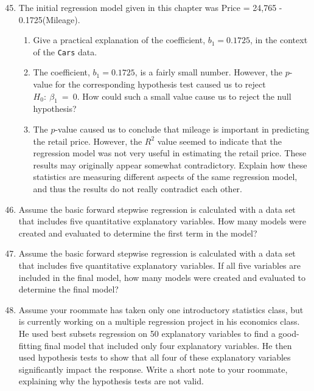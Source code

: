 \documentclass[
]{report}
\begin{document}
\begin{enumerate}
  \setcounter{enumi}{44}

  \item The initial regression model given in this chapter was Price = 24,765 - 0.1725(Mileage).
    \begin{enumerate}
      \item Give a practical explanation of the coefficient, $\scriptstyle b_1 = 0.1725$, in the context of the \texttt{Cars} data.
      \item The coefficient, $\scriptstyle b_1 = 0.1725$, is a fairly small number. However, the $\scriptstyle p$-value for the corresponding hypothesis test caused us to reject $\scriptstyle H_0:\  \beta_1 \ =\  0$. How could such a small value cause us to reject the null hypothesis?
      \item The $\scriptstyle p$-value caused us to conclude that mileage is important in predicting the retail price. However, the $\scriptstyle {R}^2$ value seemed to indicate that the regression model was not very useful in estimating the retail price. These results may originally appear somewhat contradictory. Explain how these statistics are measuring different aspects of the same regression model, and thus the results do not really contradict each other.
    \end{enumerate}

  \item Assume the basic forward stepwise regression is calculated with a data set that includes five quantitative explanatory variables. How many models were created and evaluated to determine the first term in the model?

  \item Assume the basic forward stepwise regression is calculated with a data set that includes five quantitative explanatory variables. If all five variables are included in the final model, how many models were created and evaluated to determine the final model?

  \item Assume your roommate has taken only one introductory statistics class, but is currently working on a multiple regression project in his economics class. He used best subsets regression on 50 explanatory variables to find a good-fitting final model that included only four explanatory variables. He then used hypothesis tests to show that all four of these explanatory variables significantly impact the response. Write a short note to your roommate, explaining why the hypothesis tests are not valid.


\end{enumerate}
\end{document}
